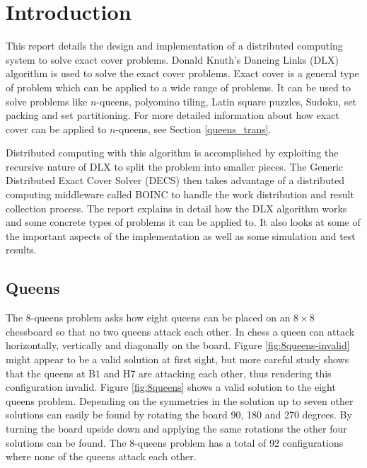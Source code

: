
\chapter{Introduction}

This report details the design and implementation of a distributed computing system to solve exact cover problems.
Donald Knuth's Dancing Links (DLX) algorithm \cite{knuth00dancing} is used to solve the exact cover problems.
Exact cover is a general type of problem which can be applied to a wide range of problems.
It can be used to solve problems like $n$-queens, polyomino tiling, Latin square puzzles, Sudoku, set packing and set partitioning.
For more detailed information about how exact cover can be applied to $n$-queens, see Section \ref{queens_trans}.

Distributed computing with this algorithm is accomplished by exploiting the recursive nature of DLX to split the problem into smaller pieces.
The Generic Distributed Exact Cover Solver (DECS) then takes advantage of a distributed computing middleware called BOINC \cite{boinc} to handle the work distribution and result collection process.
The report explains in detail how the DLX algorithm works and some concrete types of problems it can be applied to.
It also looks at some of the important aspects of the implementation as well as some simulation and test results.



\section{Queens}
\label{intro_queens}

The 8-queens problem asks how eight queens can be placed on an $8 \times 8$ chessboard so that no two queens attack each other.
In chess a queen can attack horizontally, vertically and diagonally on the board.
Figure \ref{fig:8queens-invalid} might appear to be a valid solution at first sight, but more careful study shows that the queens at B1 and H7 are attacking each other, thus rendering this configuration invalid.
Figure \ref{fig:8queens} shows a valid solution to the eight queens problem.
Depending on the symmetries in the solution up to seven other solutions can easily be found by rotating the board 90, 180 and 270 degrees.
By turning the board upside down and applying the same rotations the other four solutions can be found.
The 8-queens problem has a total of 92 configurations where none of the queens attack each other.

